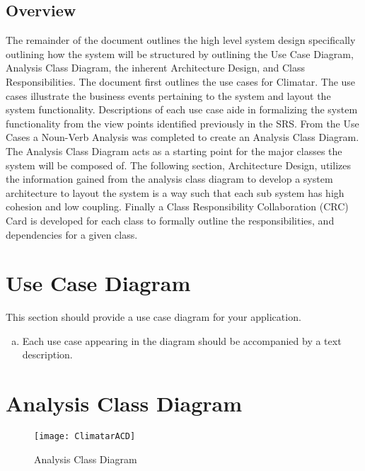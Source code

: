 \documentclass[]{article}
\begin{document}
\subsection{Overview}
\label{sub:overview}
The remainder of the document outlines the high level system design specifically outlining how the system will be structured by outlining the Use Case Diagram, Analysis Class Diagram, the inherent Architecture Design, and Class Responsibilities. The document first outlines the use cases for Climatar. The use cases illustrate the business events pertaining to the system and layout the system functionality. Descriptions of each use case aide in formalizing the system functionality from the view points identified previously in the SRS. From the Use Cases a Noun-Verb Analysis was completed to create an Analysis Class Diagram. The Analysis Class Diagram acts as a starting point for the major classes the system will be composed of. The following section, Architecture Design, utilizes the information gained from the analysis class diagram to develop a system architecture to layout the system is a way such that each sub system has high cohesion and low coupling. Finally a Class Responsibility Collaboration (CRC) Card is developed for each class to formally outline the responsibilities, and dependencies for a given class.


\section{Use Case Diagram}
\label{sec:use_case_diagram}

This section should provide a use case diagram for your application. 
\begin{enumerate}[a)]
	\item Each use case appearing in the diagram should be accompanied by a text description. 
\end{enumerate}

\section{Analysis Class Diagram}
\label{sec:analysis_class_diagram}

\begin{figure}[ht!]
\centering
\texttt{[image: ClimatarACD]}
\caption{Analysis Class Diagram\label{acd}}
\end{figure}
\end{document}
